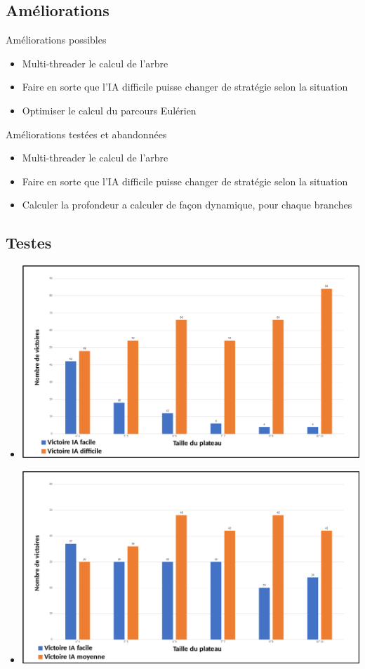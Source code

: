 \documentclass{beamer}
\begin{document}
\subsection{Améliorations}
\begin{frame}{}
\begin{block}{Améliorations possibles}
\begin{itemize}
 \item<1-> Multi-threader le calcul de l’arbre
 \item<2-> Faire en sorte que l’IA difficile puisse changer de stratégie selon la situation
 \item<3-> Optimiser le calcul du parcours Eulérien
\end{itemize}
\end{block}
\begin{block}{Améliorations testées et abandonnées}
\begin{itemize}
 \item<1-> Multi-threader le calcul de l’arbre
 \item<2-> Faire en sorte que l’IA difficile puisse changer de stratégie selon la situation
 \item<3-> Calculer la profondeur a calculer de façon dynamique, pour chaque branches
\end{itemize}
\end{block}
\end{frame}

\subsection{Testes}
\begin{frame}{}
\begin{block}{}
\begin{itemize}
 \item<1-> \includegraphics[scale=0.2]{IA10}
 \item<2-> \includegraphics[scale=0.2]{IA11}
\end{itemize}
\end{block}
\end{frame}
\end{document}
